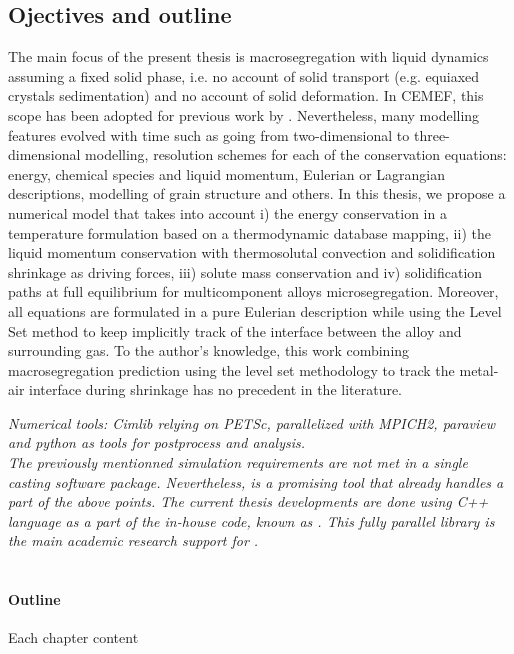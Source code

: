 \subsection{Ojectives and outline}
The main focus of the present thesis is macrosegregation with liquid dynamics assuming a fixed solid phase, i.e. no account of solid 
transport (e.g. equiaxed crystals sedimentation) and no account of solid deformation. In CEMEF, this scope has been adopted for previous 
work by \citet{gouttebroze_modelisation_2005, liu_finite_2005, mosbah_multiple_2008, rivaux_simulation_2011, carozzani_developpement_2012}.
Nevertheless, many modelling features evolved with time such as going from two-dimensional to three-dimensional modelling, resolution schemes
for each of the conservation equations: energy, chemical species and liquid momentum, Eulerian or Lagrangian descriptions, modelling of grain structure and others.
In this thesis, we propose a numerical model that takes into account 
i) the energy conservation in a temperature formulation based on a thermodynamic database mapping,
ii) the liquid momentum conservation with thermosolutal convection and solidification shrinkage as driving forces, 
iii) solute mass conservation and 
iv) solidification paths at full equilibrium for multicomponent alloys microsegregation. 
Moreover, all equations are formulated in a pure Eulerian description while using the Level Set method to keep implicitly track of the interface between the alloy and surrounding gas. To the author's knowledge, this work combining macrosegregation prediction using the level set methodology to track the metal-air interface during shrinkage has no precedent in the literature.

\emph{Numerical tools: Cimlib relying on PETSc, parallelized with MPICH2, paraview and python as tools for postprocess and analysis. \\
The previously mentionned simulation requirements are not met in a single casting software package. Nevertheless, \thercast is a promising tool that already 
handles a part of the above points. The current thesis developments are done using C++ language as a part of the
in-house code, known as \cimlib \citep{digonnet_cimlib:_2007, mesri_advanced_2009}. 
This fully parallel library is the main academic research support for \thercast.\\ \\ }

\paragraph{Outline}
Each chapter content


